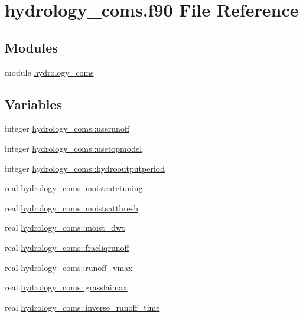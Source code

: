 \hypertarget{hydrology__coms_8f90}{}\section{hydrology\+\_\+coms.\+f90 File Reference}
\label{hydrology__coms_8f90}
\subsection*{Modules}
\begin{DoxyCompactItemize}
\item 
module \hyperlink{namespacehydrology__coms}{hydrology\+\_\+coms}
\end{DoxyCompactItemize}
\subsection*{Variables}
\begin{DoxyCompactItemize}
\item 
integer \hyperlink{namespacehydrology__coms_a072b19b9aec29e8e63c2ad3786bbf6b5}{hydrology\+\_\+coms\+::userunoff}
\item 
integer \hyperlink{namespacehydrology__coms_a20c98af9cfbbd7e0d75c0d2a421fbec7}{hydrology\+\_\+coms\+::usetopmodel}
\item 
integer \hyperlink{namespacehydrology__coms_a348ebb6cbfa8e8217dca91c1e910a611}{hydrology\+\_\+coms\+::hydrooutputperiod}
\item 
real \hyperlink{namespacehydrology__coms_a65f54a2e7ea5015b08a837fd9ffce040}{hydrology\+\_\+coms\+::moistratetuning}
\item 
real \hyperlink{namespacehydrology__coms_a9d7e7e6a1aef383c309cba9b4670a677}{hydrology\+\_\+coms\+::moistsatthresh}
\item 
real \hyperlink{namespacehydrology__coms_aa462c5cf44e4b6d6514539ea959dc840}{hydrology\+\_\+coms\+::moist\+\_\+dwt}
\item 
real \hyperlink{namespacehydrology__coms_a4b086e4a697e284b38cf48df23d29c65}{hydrology\+\_\+coms\+::fracliqrunoff}
\item 
real \hyperlink{namespacehydrology__coms_aa205de3a162ef0ad0200c32e36714a60}{hydrology\+\_\+coms\+::runoff\+\_\+vmax}
\item 
real \hyperlink{namespacehydrology__coms_ab41659cd5c15da7c08da30a343a71d89}{hydrology\+\_\+coms\+::grasslaimax}
\item 
real \hyperlink{namespacehydrology__coms_a1bb2a2286d85f992ccf8dd104ba036a3}{hydrology\+\_\+coms\+::inverse\+\_\+runoff\+\_\+time}
\end{DoxyCompactItemize}
